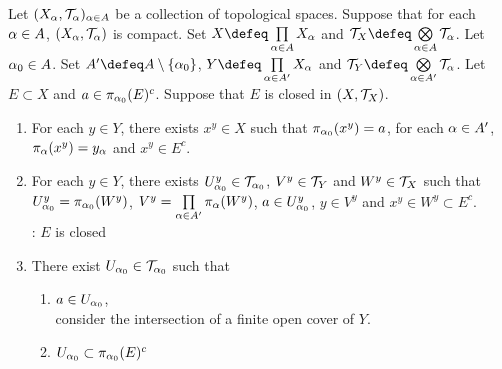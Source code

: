\documentclass{book}
\begin{document}
 	\begin{ex} 
 		Let $(X_{\alpha}, \mathcal{T}_{\alpha})_{\alpha \in A}$ be a collection of topological spaces. Suppose that for each $\alpha \in A$, $(X_{\alpha} , \mathcal{T}_{\alpha})$ is compact. Set $X \defeq \prod\limits_{\al \in A} X_{\al}$ and $\MT_X \defeq \bigotimes\limits_{\al \in A} \MT_{\al}$. Let $\alpha_0 \in A$. Set $A' \defeq A \setminus \{\al_0\}$,  $Y \defeq \prod\limits_{\al \in A'}X_{\al}$ and $\MT_Y \defeq \bigotimes\limits_{\al \in A'} \MT_{\al}$. Let $E \subset X$ and $a \in \pi_{\alpha_0}(E)^c$. Suppose that $E$ is closed in $(X, \mathcal{T}_X)$.
 		\begin{enumerate}
 			\item For each $y \in Y$, there exists $x^y \in X$ such that $\pi_{\alpha_0}(x^y) = a$, for each $\alpha \in A'$, $\pi_{\alpha}(x^y) = y_{\alpha}$ and $x^y \in E^c$.
 			\item For each $y \in Y$, there exists $U^y_{\alpha_0} \in \mathcal{T}_{\alpha_0}$, $V^y \in \mathcal{T}_Y$ and $W^y \in \mathcal{T}_X$ such that $U^y_{\alpha_0} = \pi_{\alpha_0}(W^y)$, $V^y = \prod\limits_{\alpha \in A'} \pi_{\alpha}(W^y)$, $a \in U^y_{\alpha_0}$, $y \in V^y$ and $x^y \in W^y \subset E^c$. \\
 			: $E$ is closed
 			\item There exist $U_{\alpha_0} \in \mathcal{T}_{\alpha_0}$ such that 
 			\begin{enumerate}
 				\item $a \in U_{\alpha_0}$, \\
 				 consider the intersection of a finite open cover of $Y$.
 				\item $U_{\alpha_0} \subset \pi_{\alpha_0}(E)^c$ \\
 			\end{enumerate}
 		\end{enumerate}
 	\end{ex}
 	
\end{document}
